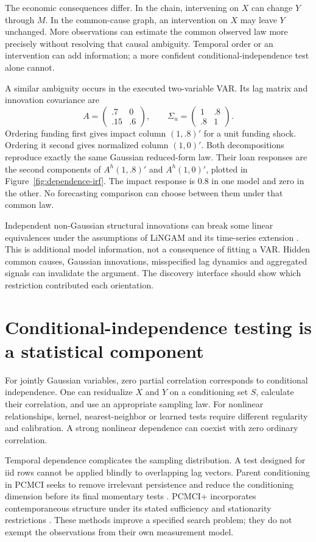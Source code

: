 The economic consequences differ. In the chain, intervening on $X$ can
change $Y$ through $M$. In the common-cause graph, an intervention on
$X$ may leave $Y$ unchanged. More observations can estimate the common
observed law more precisely without resolving that causal ambiguity.
Temporal order or an intervention can add information; a more confident
conditional-independence test alone cannot.

A similar ambiguity occurs in the executed two-variable VAR. Its lag
matrix and innovation covariance are
\[
 A=\begin{pmatrix}.7&0\\.15&.6\end{pmatrix},\qquad
 \Sigma_u=\begin{pmatrix}1&.8\\.8&1\end{pmatrix}.
\]
Ordering funding first gives impact column $(1,.8)'$ for a unit funding
shock. Ordering it second gives normalized column $(1,0)'$.
Both decompositions reproduce exactly the same Gaussian reduced-form law.
Their loan responses are the second components of $A^h(1,.8)'$ and
$A^h(1,0)'$, plotted in Figure~\ref{fig:dependence-irf}. The impact
response is $0.8$ in one model and zero in the other. No forecasting
comparison can choose between them under that common law.

Independent non-Gaussian structural innovations can break some linear
equivalences under the assumptions of LiNGAM and its time-series extension
\citep{shimizu2006,hyvarinen2010}. This is additional model information,
not a consequence of fitting a VAR. Hidden common causes, Gaussian
innovations, misspecified lag dynamics and aggregated signals can invalidate
the argument. The discovery interface should show which restriction
contributed each orientation.

\section{Conditional-independence testing is a statistical component}
For jointly Gaussian variables, zero partial correlation corresponds to
conditional independence. One can residualize $X$ and $Y$ on a
conditioning set $S$, calculate their correlation, and use an appropriate
sampling law. For nonlinear relationships, kernel, nearest-neighbor or
learned tests require different regularity and calibration. A strong
nonlinear dependence can coexist with zero ordinary correlation.

Temporal dependence complicates the sampling distribution. A test designed
for iid rows cannot be applied blindly to overlapping lag vectors. Parent
conditioning in PCMCI seeks to remove irrelevant persistence and reduce
the conditioning dimension before its final momentary tests
\citep{runge2019}. PCMCI+ incorporates contemporaneous structure under
its stated sufficiency and stationarity restrictions
\citep{runge2020}. These methods improve a specified search problem;
they do not exempt the observations from their own measurement model.


